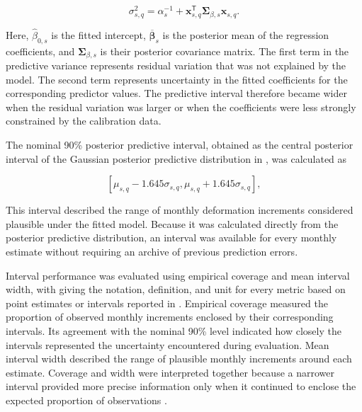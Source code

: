 \begin{equation}
\sigma_{s,q}^{2}
=
\alpha_s^{-1}
+
\boldsymbol{x}_{s,q}^{\mathsf{T}}
\boldsymbol{\Sigma}_{\beta,s}
\boldsymbol{x}_{s,q}.
\label{eq:predictive_variance}
\end{equation}

\noindent Here, $\widehat{\beta}_{0,s}$ is the fitted intercept, $\overline{\boldsymbol{\beta}}_s$ is the posterior mean of the regression coefficients, and $\boldsymbol{\Sigma}_{\beta,s}$ is their posterior covariance matrix. The first term in the predictive variance represents residual variation that was not explained by the model. The second term represents uncertainty in the fitted coefficients for the corresponding predictor values. The predictive interval therefore became wider when the residual variation was larger or when the coefficients were less strongly constrained by the calibration data.

The nominal 90\% posterior predictive interval, obtained as the central posterior interval of the Gaussian posterior predictive distribution in  \citep{bishop_pattern_2006, gelman_bayesian_2013}, was calculated as

\begin{equation}
\left[
\mu_{s,q}-1.645\sigma_{s,q},
\mu_{s,q}+1.645\sigma_{s,q}
\right],
\label{eq:prediction_interval}
\end{equation}

This interval described the range of monthly deformation increments considered plausible under the fitted model. Because it was calculated directly from the posterior predictive distribution, an interval was available for every monthly estimate without requiring an archive of previous prediction errors.

Interval performance was evaluated using empirical coverage and mean interval width, with  giving the notation, definition, and unit for every metric based on point estimates or intervals reported in . Empirical coverage measured the proportion of observed monthly increments enclosed by their corresponding intervals. Its agreement with the nominal 90\% level indicated how closely the intervals represented the uncertainty encountered during evaluation. Mean interval width described the range of plausible monthly increments around each estimate. Coverage and width were interpreted together because a narrower interval provided more precise information only when it continued to enclose the expected proportion of observations \citep{gneiting_probabilistic_2007, singh_uncertainty_2024}.

